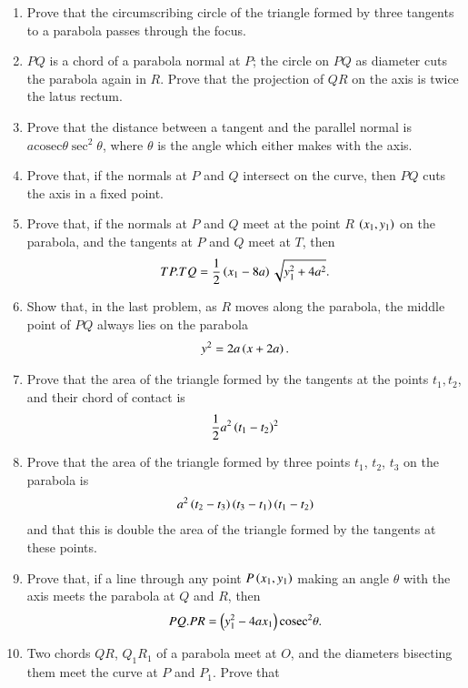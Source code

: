 \begin{enumerate}[1.]
\item Prove that the circumscribing circle of the triangle formed by three tangents to a parabola
passes through the focus.
\item $PQ$ is a chord of a parabola normal at $P$; the circle on $PQ$ as diameter cuts the parabola again in $R$.  Prove that the projection
of $QR$ on the axis is twice the latus rectum.
\item Prove that the distance between a tangent and the parallel normal is $a\text{cosec}\theta\sec^2\theta$, where $\theta$ is the
angle which either makes with the axis.
\item Prove that, if the normals at $P$ and $Q$ intersect on the curve, then $PQ$ cuts the axis in
a fixed point.
\item Prove that, if the normals at $P$ and $Q$ meet at the point $R$ $\left(x_1,y_1\right)$ on the parabola, and the tangents at $P$ and $Q$
meet at $T$, then
\begin{align*}
TP.TQ=\frac{1}{2}\left(x_1-8a\right)\sqrt{y_1^2+4a^2}.
\end{align*}
\item Show that, in the last problem, as $R$ moves along the parabola, the middle point of $PQ$
always lies on the parabola
\begin{align*}
y^2=2a\left(x+2a\right).
\end{align*}
\item Prove that the area of the triangle formed by the tangents at the points $t_1,t_2$, and their chord of 
contact is
\begin{align*}
\frac{1}{2}a^2\left(t_1-t_2\right)^2
\end{align*}
\item Prove that the area of the triangle formed by three points $t_1$, $t_2$, $t_3$ on the parabola is
\begin{align*}
a^2\left(t_2-t_3\right)\left(t_3-t_1\right)\left(t_1-t_2\right)
\end{align*}
and that this is double the area of the triangle formed by the tangents at these points.
\item Prove that, if a line through any point $P \left(x_1,y_1\right)$ making an angle $\theta$ with the axis meets the parabola
at $Q$ and $R$, then
\begin{align*}
PQ.PR = \left(y_1^2-4ax_1\right)\text{cosec}^2\theta.
\end{align*}
\item Two chords $QR$, $Q_1R_1$ of a parabola meet at $O$, and the diameters bisecting them meet the curve at $P$ and $P_1$.  Prove that

\end{enumerate}
